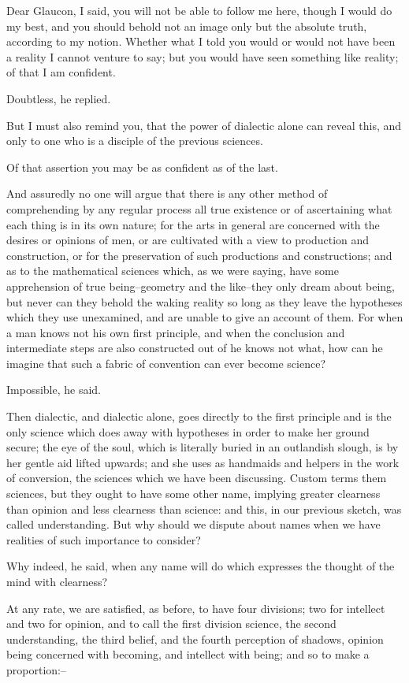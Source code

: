 Dear Glaucon, I said, you will not be able to follow me here, though
I would do my best, and you should behold not an image only but the
absolute truth, according to my notion. Whether what I told you would
or would not have been a reality I cannot venture to say; but you would
have seen something like reality; of that I am confident.

Doubtless, he replied.

But I must also remind you, that the power of dialectic alone can reveal
this, and only to one who is a disciple of the previous sciences.

Of that assertion you may be as confident as of the last.

And assuredly no one will argue that there is any other method
of comprehending by any regular process all true existence or of
ascertaining what each thing is in its own nature; for the arts in
general are concerned with the desires or opinions of men, or are
cultivated with a view to production and construction, or for the
preservation of such productions and constructions; and as to the
mathematical sciences which, as we were saying, have some apprehension
of true being--geometry and the like--they only dream about being,
but never can they behold the waking reality so long as they leave the
hypotheses which they use unexamined, and are unable to give an account
of them. For when a man knows not his own first principle, and when the
conclusion and intermediate steps are also constructed out of he knows
not what, how can he imagine that such a fabric of convention can ever
become science?

Impossible, he said.

Then dialectic, and dialectic alone, goes directly to the first
principle and is the only science which does away with hypotheses in
order to make her ground secure; the eye of the soul, which is literally
buried in an outlandish slough, is by her gentle aid lifted upwards;
and she uses as handmaids and helpers in the work of conversion, the
sciences which we have been discussing. Custom terms them sciences,
but they ought to have some other name, implying greater clearness
than opinion and less clearness than science: and this, in our previous
sketch, was called understanding. But why should we dispute about names
when we have realities of such importance to consider?

Why indeed, he said, when any name will do which expresses the thought
of the mind with clearness?

At any rate, we are satisfied, as before, to have four divisions;
two for intellect and two for opinion, and to call the first division
science, the second understanding, the third belief, and the fourth
perception of shadows, opinion being concerned with becoming, and
intellect with being; and so to make a proportion:--

